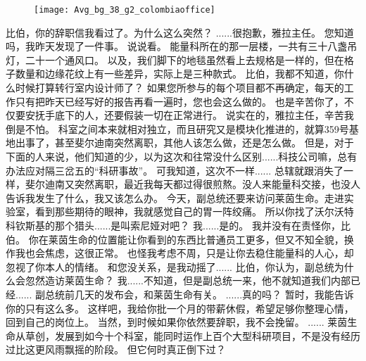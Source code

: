 \documentclass[openany]{book}
\begin{document}
\begin{figure}[h]
    \centering
    \texttt{[image: Avg\_bg\_38\_g2\_colombiaoffice]}
\end{figure}
\begin{dialogue}
     比伯，你的辞职信我看过了。为什么这么突然？
     ......很抱歉，雅拉主任。
     您知道吗，我昨天发现了一件事。
     说说看。
     能量科所在的那一层楼，一共有三十八盏吊灯，二十一个通风口。
     以及，我们脚下的地毯虽然看上去规格是一样的，但在格子数量和边缘花纹上有一些差异，实际上是三种款式。
     比伯，我都不知道，你什么时候打算转行室内设计师了？
     如果您所参与的每个项目都不再确定，每天的工作只有把昨天已经写好的报告再看一遍时，您也会这么做的。
     也是辛苦你了，不仅要安抚手底下的人，还要假装一切在正常进行。
     说实在的，雅拉主任，辛苦我倒是不怕。
     科室之间本来就相对独立，而且研究又是模块化推进的，就算359号基地出事了，甚至斐尔迪南突然离职，其他人该怎么做，还是怎么做。
     但是，对于下面的人来说，他们知道的少，以为这次和往常没什么区别......科技公司嘛，总有办法应对隔三岔五的“科研事故”。
     可我知道，这次不一样......
     总辖就跟消失了一样，斐尔迪南又突然离职，最近我每天都过得很煎熬。没人来能量科交接，也没人告诉我发生了什么，我又该怎么办。
     今天，副总统还要来访问莱茵生命。走进实验室，看到那些期待的眼神，我就感觉自己的胃一阵绞痛。
     所以你找了沃尔沃特科钦斯基的那个猎头......是叫索尼娅对吧？
     我......是的。
     我并没有在责怪你，比伯。
     你在莱茵生命的位置能让你看到的东西比普通员工更多，但又不知全貌，换作我也会焦虑，这很正常。
     也怪我考虑不周，只是让你去稳住能量科的人心，却忽视了你本人的情绪。
     和您没关系，是我动摇了......
     比伯，你认为，副总统为什么会忽然造访莱茵生命？
     我......不知道，但是副总统一来，他不就知道我们内部已经......
     副总统前几天的发布会，和莱茵生命有关。
     ......真的吗？
     暂时，我能告诉你的只有这么多。
     这样吧，我给你批一个月的带薪休假，希望足够你整理心情，回到自己的岗位上。
     当然，到时候如果你依然要辞职，我不会挽留。
     ......
     莱茵生命从草创，发展到如今十个科室，能同时运作上百个大型科研项目，不是没有经历过比这更风雨飘摇的阶段。
     但它何时真正倒下过？

\end{dialogue}
\end{document}

